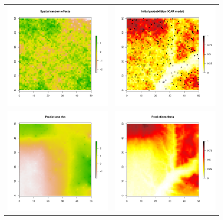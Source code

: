 \documentclass[a4paper, 12pt, leqno]{article}\usepackage[]{graphicx}\usepackage[]{color}
\begin{document}
\begin{figure}
  \begin{center}
    \begin{tabular}{cc}
      \includegraphics[width=6.5cm]{figures/binom-iCAR-plots1.pdf} & 
      \includegraphics[width=6.5cm]{figures/binom-iCAR-plots2.pdf} \\
      \includegraphics[width=6.5cm]{figures/binom-iCAR-results1.pdf} &
      \includegraphics[width=6.5cm]{figures/binom-iCAR-results2.pdf} \\

\end{tabular}
\end{center}
\end{figure}
\end{document}
